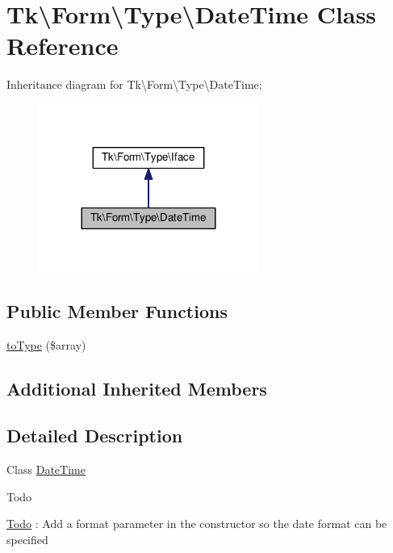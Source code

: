\hypertarget{classTk_1_1Form_1_1Type_1_1DateTime}{\section{Tk\textbackslash{}Form\textbackslash{}Type\textbackslash{}Date\+Time Class Reference}
\label{classTk_1_1Form_1_1Type_1_1DateTime}
}


Inheritance diagram for Tk\textbackslash{}Form\textbackslash{}Type\textbackslash{}Date\+Time\+:\nopagebreak
\begin{figure}[H]
\begin{center}
\leavevmode
\includegraphics[width=204pt]{classTk_1_1Form_1_1Type_1_1DateTime__inherit__graph}
\end{center}
\end{figure}
\subsection*{Public Member Functions}
\begin{DoxyCompactItemize}
\item 
\hyperlink{classTk_1_1Form_1_1Type_1_1DateTime_a9e5a3c1d7a546b3cdf88096ef6f11b50}{to\+Type} (\$array)
\end{DoxyCompactItemize}
\subsection*{Additional Inherited Members}


\subsection{Detailed Description}
Class \hyperlink{classTk_1_1Form_1_1Type_1_1DateTime}{Date\+Time}

\begin{DoxyRefDesc}{Todo}
\item[\hyperlink{todo__todo000002}{Todo}]\+: Add a format parameter in the constructor so the date format can be specified\end{DoxyRefDesc}


